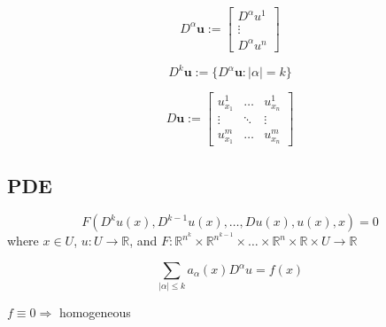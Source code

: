 \documentclass{blog}
\begin{document}
\begin{definition}
    \begin{equation}
        \label{eq:Ds-alpha}
        D^{\alpha} \boldsymbol{u} :=
        \begin{bmatrix}
            D^{\alpha}u^{1} \\ \vdots \\ D^{\alpha}u^{n}
        \end{bmatrix}
    \end{equation}
\end{definition}

\begin{definition}[$D^{k}\boldsymbol{u}$]
    \begin{equation}
        \label{eq:Dsk}
        D^{k} \boldsymbol{u} := \{D^{\alpha} \boldsymbol{u} : |\alpha| = k\}
    \end{equation}
\end{definition}

\begin{definition}
    \begin{equation}
        \label{eq:Ds}
        D\boldsymbol{u} :=
        \begin{bmatrix}
            u_{x_{1}}^{1} & \dots  & u_{x_{n}}^{1} \\
            \vdots        & \ddots & \vdots        \\
            u_{x_{1}}^{m} & \dots  & u_{x_{n}}^{m}
        \end{bmatrix}
    \end{equation}
\end{definition}

\subsection{PDE}
\begin{definition}
    \begin{equation}
        \label{eq:pde}
        F(D^{k}u(x), D^{k-1}u(x), \dots, Du(x), u(x), x) = 0
    \end{equation}
    where $x \in U$, $u : U \to \mathbb{R}$, and $F : \mathbb{R}^{n^{k}} \times \mathbb{R}^{n^{k-1}} \times \dots \times \mathbb{R}^{n} \times \mathbb{R} \times U \to \mathbb{R}$
\end{definition}

\begin{definition}
    \begin{equation}
        \label{eq:linear-pde}
        \sum_{|\alpha| \leq k} a_{\alpha}(x) D^{\alpha} u = f(x)
    \end{equation}

    $f \equiv 0 \Rightarrow$ homogeneous
\end{definition}
\end{document}

